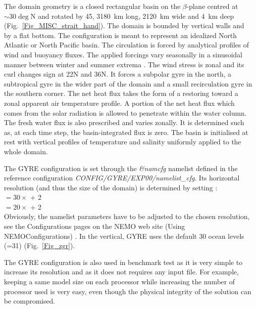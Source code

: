 The domain geometry is a closed rectangular basin on the $\beta$-plane centred 
at $\sim 30\deg$N and rotated by 45\deg, 3180~km long, 2120~km wide 
and 4~km deep (Fig.~\ref{Fig_MISC_strait_hand}). 
The domain is bounded by vertical walls and by a flat bottom. The configuration is 
meant to represent an idealized North Atlantic or North Pacific basin. 
The circulation is forced by analytical profiles of wind and buoyancy fluxes. 
The applied forcings vary seasonally in a sinusoidal manner between winter 
and summer extrema \citep{Levy_al_OM10}. 
The wind stress is zonal and its curl changes sign at 22\deg N and 36\deg N. 
It forces a subpolar gyre in the north, a subtropical gyre in the wider part of the domain 
and a small recirculation gyre in the southern corner. 
The net heat flux takes the form of a restoring toward a zonal apparent air 
temperature profile. A portion of the net heat flux which comes from the solar radiation
is allowed to penetrate within the water column. 
The fresh water flux is also prescribed and varies zonally. 
It is determined such as, at each time step, the basin-integrated flux is zero. 
The basin is initialised at rest with vertical profiles of temperature and salinity 
uniformly applied to the whole domain.

The GYRE configuration is set through the \textit{\&namcfg} namelist defined in the reference 
configuration \textit{CONFIG/GYRE/EXP00/namelist\_cfg}. Its horizontal resolution 
(and thus the size of the domain) is determined by setting  : \\
 $= 30 \times$  + 2   \\
 $= 20 \times$  + 2   \\
Obviously, the namelist parameters have to be adjusted to the chosen resolution, see the Configurations 
pages on the NEMO web site (Using NEMO\/Configurations) .
In the vertical, GYRE uses the default 30 ocean levels (=31) (Fig.~\ref{Fig_zgr}).

The GYRE configuration is also used in benchmark test as it is very simple to increase 
its resolution and as it does not requires any input file. For example, keeping a same model size 
on each processor while increasing the number of processor used is very easy, even though the 
physical integrity of the solution can be compromised.

